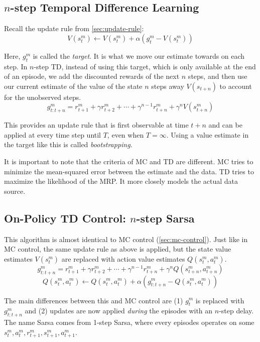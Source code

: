 \documentclass{article}
\begin{document}
\subsection{$n$-step Temporal Difference Learning}
Recall the update rule from \ref{sec:update-rule}:
\begin{equation*}
  V(s_t^m) \leftarrow V(s_t^m) + \alpha (g_t^m - V(s_t^m))
\end{equation*}

Here, $g_t^m$ is called the \emph{target}. It is what we move our estimate towards on each step. In $n$-step TD, instead of using this target,
which is only available at the end of an episode, we add the discounted rewards of the next $n$ steps, and then use our current estimate 
of the value of the state $n$ steps away $V(s_{t+n})$ to account for the unobserved steps.
\begin{equation}
  g_{t:t+n}^m = r_{t+1}^m + \gamma r_{t+2}^m + \cdots + \gamma^{n-1} r_{t+n}^m + \gamma^n V(s_{t+n}^m)
\end{equation}

This provides an update rule that is first observable at time $t+n$ and can be applied at every time step until $T$, even when $T = \infty$. 
Using a value estimate in the target like this is called \emph{bootstrapping}.

It is important to note that the criteria of MC and TD are different. MC tries to minimize the mean-squared error between the estimate and the data.
TD tries to maximize the likelihood of the MRP. It more closely models the actual data source.

\subsection{On-Policy TD Control: $n$-step Sarsa}
This algorithm is almost identical to MC control (\ref{sec:mc-control}). Just like in MC control, the same update rule as above is applied, 
but the state value estimates $V(s_t^m)$ are replaced with action value estimates $Q(s_t^m, a_t^m)$.
\begin{equation}
  g_{t:t+n}^m = r_{t+1}^m + \gamma r_{t+2}^m + \cdots + \gamma^{n-1} r_{t+n}^m + \gamma^n Q(s_{t+n}^m, a_{t+n}^m) \label{eq:n-td-update}
\end{equation}
\begin{equation}
  Q(s_t^m, a_t^m) \leftarrow Q(s_t^m, a_t^m) + \alpha (g_{t:t+n}^m - Q(s_t^m, a_t^m))
\end{equation}

The main differences between this and MC control are (1) $g_t^m$ is replaced with $g_{t:t+n}^m$ and (2) updates are now applied \emph{during} the
episodes with an $n$-step delay. The name Sarsa comes from 1-step Sarsa, where every episodes operates on some $s_t^m, a_t^m, r_{t+1}^m, s_{t+1}^m, a_{t+1}^m$.
\end{document}
